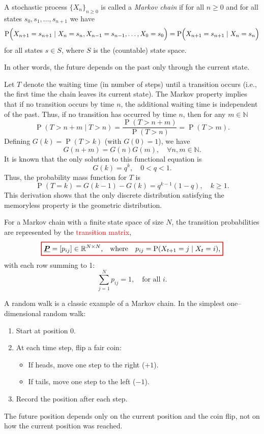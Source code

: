 \documentclass[11pt, headings=standardclasses, parskip=half, twoside]{scrartcl}
\newcommand{\matr}[1]{\underline{\boldsymbol{#1}}}
\newcommand{\R}{\mathbb{R}}
\newcommand{\N}{\mathbb{N}}
\newcommand{\Prob}{\operatorname{P}}
\begin{document}
\begin{definition}\label{def:markov}
A stochastic process \(\{X_n\}_{n\ge0}\) is called a \emph{Markov chain} if for all \(n\ge0\) and for all states \(s_0,s_1,\ldots,s_{n+1}\) we have
\[
\Prob\Bigl(X_{n+1}=s_{n+1}\mid X_n=s_n, X_{n-1}=s_{n-1},\ldots,X_0=s_0\Bigr)=\Prob\Bigl(X_{n+1}=s_{n+1}\mid X_n=s_n\Bigr)
\]
for all states \(s \in S\), where \(S\) is the (countable) state space.
\end{definition}
In other words, the future depends on the past only through the current state.

Let \(T\) denote the waiting time (in number of steps) until a transition occurs (i.e., the first time the chain leaves its current state). The Markov property implies that if no transition occurs by time \(n\), the additional waiting time is independent of the past. Thus, if no transition has occurred by time \(n\), then for any \(m\in\N\)
\[
\Prob(T>n+m\mid T>n)=\frac{\Prob(T>n+m)}{\Prob(T>n)}=\Prob(T>m).
\]
Defining \(G(k)=\Prob(T>k)\) (with \(G(0)=1\)), we have
\[
G(n+m)=G(n)G(m),\quad \forall n,m\in\N.
\]
It is known that the only solution to this functional equation is
\[
G(k)=q^k,\quad 0<q<1.
\]
Thus, the probability mass function for \(T\) is
\[
\Prob(T=k)=G(k-1)-G(k)=q^{k-1}(1-q),\quad k\ge 1.
\]
This derivation shows that the only discrete distribution satisfying the memoryless property is the geometric distribution.

For a Markov chain with a finite state space of size \(N\), the transition probabilities are represented by the \textcolor{red}{transition matrix},
\[
  {\color{red}
  \setlength{\fboxrule}{1pt}
  \boxed{ 
  \color{black}
  \matr{P}=[p_{ij}] \in \R^{N \times N} \text{,} \quad \text{where} \quad p_{ij}=\Prob(X_{t+1}=j\mid X_t=i)\text{,}
  }
  }
\]
with each row summing to 1:
\[
\sum_{j=1}^{N} p_{ij}=1,\quad \text{for all } i.
\]

\begin{example}\label{ex:randomwalk}
A random walk is a classic example of a Markov chain. In the simplest one–dimensional random walk:
\begin{enumerate}[before={\parskip = 0em}, nosep]
  \item Start at position 0.
  \item At each time step, flip a fair coin:
  \begin{itemize}[before={\parskip = 0em}, nosep]
    \item If heads, move one step to the right (\(+1\)).
    \item If tails, move one step to the left (\(-1\)).
  \end{itemize}
  \item Record the position after each step.
\end{enumerate}
The future position depends only on the current position and the coin flip, not on how the current position was reached.
\end{example}
\end{document}
